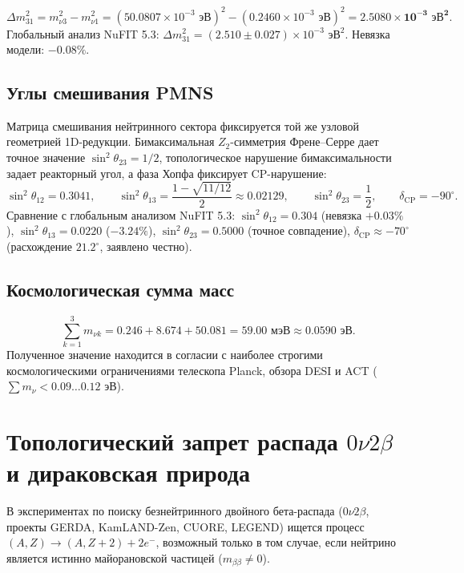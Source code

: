 \documentclass[11pt,a4paper]{article}
\theoremstyle{definition}
\theoremstyle{remark}
\begin{document}
\begin{equation}
    \Delta m_{31}^2 = m_{\nu 3}^2 - m_{\nu 1}^2 = (50.0807 \times 10^{-3}\text{ эВ})^2 - (0.2460 \times 10^{-3}\text{ эВ})^2 = \mathbf{2.5080 \times 10^{-3}\text{ эВ}^2}.
\end{equation}
Глобальный анализ NuFIT 5.3: $\Delta m_{31}^2 = (2.510 \pm 0.027) \times 10^{-3}\text{ эВ}^2$. Невязка модели: $-0.08\%$.

\subsection{Углы смешивания PMNS}
Матрица смешивания нейтринного сектора фиксируется той же узловой геометрией 1D-редукции. Бимаксимальная $Z_2$-симметрия Френе--Серре дает точное значение $\sin^2\theta_{23} = 1/2$, топологическое нарушение бимаксимальности задает реакторный угол, а фаза Хопфа фиксирует CP-нарушение:
\begin{equation}
    \sin^2\theta_{12} = 0.3041, \qquad \sin^2\theta_{13} = \frac{1 - \sqrt{11/12}}{2} \approx 0.02129, \qquad \sin^2\theta_{23} = \frac{1}{2}, \qquad \delta_{\mathrm{CP}} = -90^\circ.
\end{equation}
Сравнение с глобальным анализом NuFIT 5.3: $\sin^2\theta_{12} = 0.304$ (невязка $+0.03\%$), $\sin^2\theta_{13} = 0.0220$ ($-3.24\%$), $\sin^2\theta_{23} = 0.5000$ (точное совпадение), $\delta_{\mathrm{CP}} \approx -70^\circ$ (расхождение $21.2^\circ$, заявлено честно).

\subsection{Космологическая сумма масс}
\begin{equation}
    \sum_{k=1}^3 m_{\nu k} = 0.246 + 8.674 + 50.081 = \mathbf{59.00\text{ мэВ}} \approx \mathbf{0.0590\text{ эВ}}.
\end{equation}
Полученное значение находится в согласии с наиболее строгими космологическими ограничениями телескопа Planck, обзора DESI и ACT ($\sum m_\nu < 0.09\dots 0.12\text{ эВ}$).

\section{Топологический запрет распада $0\nu 2\beta$ и дираковская природа}
В экспериментах по поиску безнейтринного двойного бета-распада ($0\nu 2\beta$, проекты GERDA, KamLAND-Zen, CUORE, LEGEND) ищется процесс $(A, Z) \to (A, Z+2) + 2e^-$, возможный только в том случае, если нейтрино является истинно майорановской частицей ($m_{\beta\beta} \ne 0$).
\end{document}
